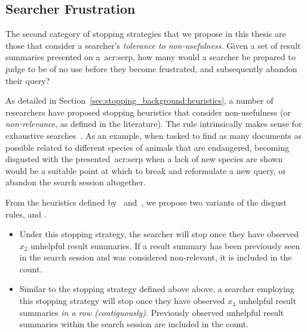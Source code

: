 \subsection{Searcher Frustration}


The second category of stopping strategies that we propose in this thesis are those that consider a searcher's \emph{tolerance to non-usefulness}. Given a set of result summaries presented on a~\gls{acr:serp}, how many would a searcher be prepared to judge to be of no use before they become frustrated, and subsequently abandon their query?

As detailed in Section~\ref{sec:stopping_background:heuristics}, a number of researchers have proposed stopping heuristics that consider non-usefulness (or \emph{non-relevance}, as defined in the literature). The rule intrinsically makes sense for exhaustive searches~\cite{kraft1979stopping_rules}. As an example, when tasked to find as many documents as possible related to different species of animals that are endangered, becoming disgusted with the presented~\gls{acr:serp} when a lack of new species are shown would be a suitable point at which to break and reformulate a new query, or abandon the search session altogether.

From the heuristics defined by~\citealt{cooper1973retrieval_effectiveness_ii} and~\citealt{kraft1979stopping_rules}, we propose two variants of the disgust rules,  and .

\begin{itemize}
    
    \item[]{} Under this stopping strategy, the searcher will stop once they have observed $x_2$ unhelpful result summaries. If a result summary has been previously seen in the search session and was considered non-relevant, it is included in the count.
    
    \item[]{} Similar to the stopping strategy defined above above, a searcher employing this stopping strategy will stop once they have observed $x_3$ unhelpful result summaries \emph{in a row (contiguously)}. Previously observed unhelpful result summaries within the search session are included in the count.
    
\end{itemize}

